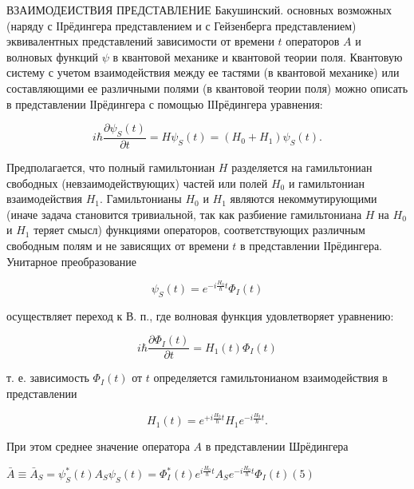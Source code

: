 \documentclass[10pt]{article}
\begin{document}
ВЗАИМОДЕИСТВИЯ ПРЕДСТАВЛЕНИЕ Бакушинский. основных возможных (наряду с ІІрёдингера представлением и с Гейзенберга представлением) эквивалентных представлений зависимости от времени $t$ операторов $A$ и волновых функций $\psi$ в квантовой механике и квантовой теории поля. Квантовую систему с учетом взаимодействия между ее тастями (в квантовой механике) или составляющими ее различными полями (в квантовой теории поля) можно описать в представлении ІІрёдингера с помощью ІІІрёдингера уравнения:



\[

i \hbar \frac{\partial \psi_{S}(t)}{\partial t}=H \psi_{S}(t)=\left(H_{0}+H_{1}\right) \psi_{S}(t) .

\]



Предполагается, что полный гамильтониан $H$ разделяется на гамильтониан свободных (невзаимодействующих) частей или полей $H_{0}$ и гамильтониан взаимодействия $H_{1}$. Гамильтонианы $H_{0}$ и $H_{1}$ являются некоммутирующими (иначе задача становится тривиальной, так как разбиение гамильтониана $H$ на $H_{0}$ и $H_{1}$ теряет смысл) функциями операторов, соответствующих различным свободным полям и не зависящих от времени $t$ в представлении ІІрёдингера. Унитарное преобразование



\[

\psi_{S}(t)=e^{-i \frac{H_{0}}{\hbar} t} \Phi_{I}(t)

\]



осуществляет переход к В. п., где волновая функция удовлетворяет уравнению:



\[

i \hbar \frac{\partial \Phi_{I}(t)}{\partial t}=H_{1}(t) \Phi_{I}(t)

\]



т. е. зависимость $\Phi_{I}(t)$ от $t$ определяется гамильтонианом взаимодействия в представлении



\[

H_{1}(t)=e^{+i \frac{H_{0}}{\hbar} t} H_{1} e^{-i \frac{H_{0}}{\hbar} t} .

\]



При этом среднее значение оператора $A$ в представлении Шрёдингера



$\bar{A} \equiv \bar{A}_{S}=\psi_{S}^{*}(t) A_{S} \psi_{S}(t)=\Phi_{I}^{*}(t) e^{i \frac{H_{0}}{\hbar} t} A_{S} e^{-i \frac{H_{0}}{\hbar} t} \Phi_{I}(t)(5)$
\end{document}
